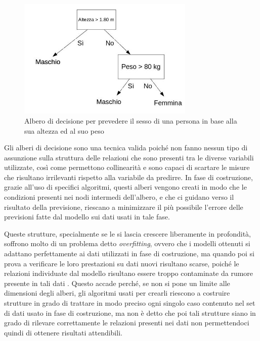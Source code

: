\documentclass[a4paper]{report}
\begin{document}


\begin{figure}[h]
\centering
\includegraphics[width=0.75\textwidth]{decision_tree}
\caption{Albero di decisione per prevedere il sesso di una persona in base alla sua altezza ed al suo peso}
\label{fig:decision_tree}
\end{figure}

Gli alberi di decisione sono una tecnica valida poiché non fanno nessun tipo di assunzione sulla struttura delle relazioni che sono presenti tra le diverse variabili utilizzate, così come permettono collinearità e sono capaci di scartare le misure che risultano irrilevanti rispetto alla variabile da predirre. In fase di costruzione, grazie all'uso di specifici algoritmi, questi alberi vengono creati in modo che le condizioni presenti nei nodi intermedi dell'albero, e che ci guidano verso il risultato della previsione, riescano a minimizzare il più possibile l'errore delle previsioni fatte dal modello sui dati usati in tale fase.

Queste strutture, specialmente se le si lascia crescere liberamente in profondità, soffrono molto di un problema detto \textit{overfitting}, ovvero che i modelli ottenuti si adattano perfettamente ai dati utilizzati in fase di costruzione, ma quando poi si prova a verificare le loro prestazioni su dati nuovi risultano scarse, poiché le relazioni individuate dal modello risultano essere troppo contaminate da rumore presente in tali dati \cite{bramer2007avoiding}. Questo accade perché, se non si pone un limite alle dimensioni degli alberi, gli algoritmi usati per crearli riescono a costruire strutture in grado di trattare in modo preciso ogni singolo caso contenuto nel set di dati usato in fase di costruzione, ma non è detto che poi tali strutture siano in grado di rilevare correttamente le relazioni presenti nei dati non permettendoci quindi di ottenere risultati attendibili.
\end{document}
